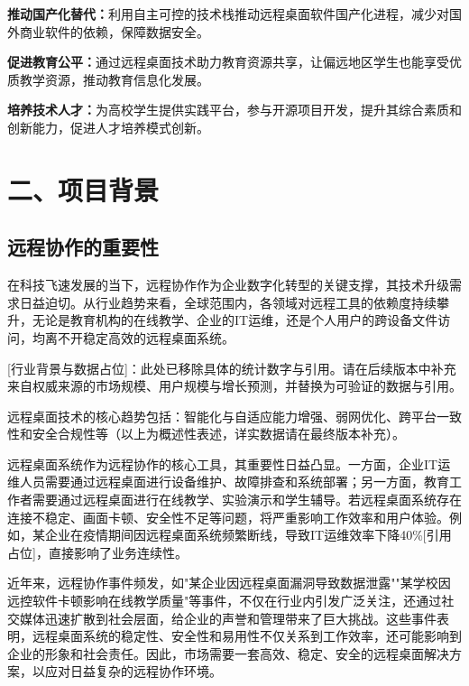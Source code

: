 \documentclass[12pt,a4paper]{article}
\renewcommand{\cite}[1]{[引用占位]}
\begin{document}
\textbf{推动国产化替代：}利用自主可控的技术栈推动远程桌面软件国产化进程，减少对国外商业软件的依赖，保障数据安全。

\textbf{促进教育公平：}通过远程桌面技术助力教育资源共享，让偏远地区学生也能享受优质教学资源，推动教育信息化发展。

\textbf{培养技术人才：}为高校学生提供实践平台，参与开源项目开发，提升其综合素质和创新能力，促进人才培养模式创新。

\section{二、项目背景}

\subsection{远程协作的重要性}

在科技飞速发展的当下，远程协作作为企业数字化转型的关键支撑，其技术升级需求日益迫切。从行业趋势来看，全球范围内，各领域对远程工具的依赖度持续攀升，无论是教育机构的在线教学、企业的IT运维，还是个人用户的跨设备文件访问，均离不开稳定高效的远程桌面系统。


[行业背景与数据占位]：此处已移除具体的统计数字与引用。请在后续版本中补充来自权威来源的市场规模、用户规模与增长预测，并替换为可验证的数据与引用。

远程桌面技术的核心趋势包括：智能化与自适应能力增强、弱网优化、跨平台一致性和安全合规性等（以上为概述性表述，详实数据请在最终版本补充）。

远程桌面系统作为远程协作的核心工具，其重要性日益凸显。一方面，企业IT运维人员需要通过远程桌面进行设备维护、故障排查和系统部署；另一方面，教育工作者需要通过远程桌面进行在线教学、实验演示和学生辅导。若远程桌面系统存在连接不稳定、画面卡顿、安全性不足等问题，将严重影响工作效率和用户体验。例如，某企业在疫情期间因远程桌面系统频繁断线，导致IT运维效率下降40\%\cite{case2020enterprise}，直接影响了业务连续性。

近年来，远程协作事件频发，如"某企业因远程桌面漏洞导致数据泄露""某学校因远控软件卡顿影响在线教学质量"等事件，不仅在行业内引发广泛关注，还通过社交媒体迅速扩散到社会层面，给企业的声誉和管理带来了巨大挑战。这些事件表明，远程桌面系统的稳定性、安全性和易用性不仅关系到工作效率，还可能影响到企业的形象和社会责任。因此，市场需要一套高效、稳定、安全的远程桌面解决方案，以应对日益复杂的远程协作环境。
\end{document}
